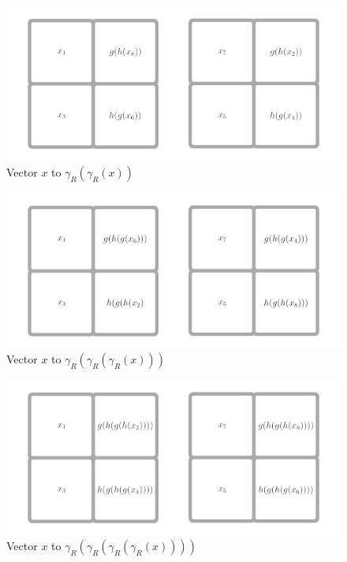 \documentclass[12pt,a4paper]{article}
\theoremstyle{custom}
\begin{document}
\begin{figure}[H]
\centering
\includegraphics[scale=0.155]{Rhoch2.jpg}
\caption{Vector $x$ to $\gamma_R (\gamma_R(x))$}
\end{figure}
\begin{figure}[H]
\centering
\includegraphics[scale=0.155]{Rhoch3.jpg}
\caption{Vector $x$ to $\gamma_R ( \gamma_R (\gamma_R(x)))$}
\end{figure}
\begin{figure}[H]
\centering
\includegraphics[scale=0.155]{Rhoch4.jpg}
\caption{Vector $x$ to $\gamma_R ( \gamma_R ( \gamma_R (\gamma_R(x))))$}
\end{figure}
\end{document}
